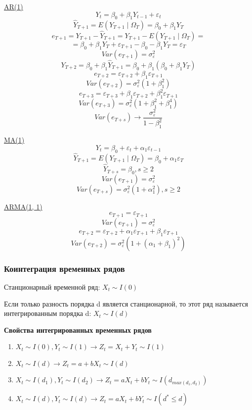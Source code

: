\documentclass[a4paper, 12pt]{article}
\begin{document}
\underline{AR(1)}
\[Y_t = \beta_0 + \beta_1 Y_{t - 1} + \varepsilon_t\]
\[\hat Y_{T + 1} = E(Y_{T+1} \mid \Omega_{T}) = \beta_0 + \beta_1 Y_T\]
\[e_{T + 1} = Y_{T+1} - \hat Y_{T + 1} = Y_{T + 1} - E(Y_{T+1} \mid \Omega_{T}) = \]
\[= \beta_0 + \beta_1 Y_T + \varepsilon_{T + 1} - \beta_0 - \beta_1 Y_T = \varepsilon_T\]
\[Var(e_{T + 1}) = \sigma_{\varepsilon}^{2}\]
\[Y_{T + 2} = \beta_0 + \beta_1 \hat Y_{T + 1} = \beta_0 + \beta_1(\beta_0 + \beta_1 Y_T)\]
\[e_{T+2} = \varepsilon_{T + 2} + \beta_1 \varepsilon_{T + 1}\]
\[Var(e_{T+2}) = \sigma_{\varepsilon}^{2}(1 + \beta_{1}^{2})\]
\[e_{T + 3} = \varepsilon_{T + 3} + \beta_1 \varepsilon_{T + 2} + \beta_{1}^{2} \varepsilon_{T + 1}\]
\[Var(e_{T + 3}) = \sigma_{\varepsilon}^{2}(1 + \beta_{1}^{2} + \beta_{1}^{4})\]
\[Var(e_{T +s}) \rightarrow \frac{\sigma_{\varepsilon}^{2}}{1 - \beta_{1}^{2}}\]

\underline{MA(1)}
\[Y_{t} = \beta_0 + \varepsilon_{t} + \alpha_{1}\varepsilon_{t-1}\]
\[\hat Y_{T + 1} = E(Y_{T + 1} \mid \Omega_{T}) = \beta_0 + \alpha_1 \varepsilon_T\]
\[\hat Y_{T + s} = \beta_0, s \geq 2\]
\[Var(e_{T + 1}) = \sigma_{\varepsilon}^{2}\]
\[Var(e_{T + s}) = \sigma_{\varepsilon}^{2}(1 + \alpha_{1}^{2}), s \geq 2\]

\underline{ARMA(1, 1)}
\[e_{T + 1} = \varepsilon_{T + 1}\]
\[Var(e_{T + 1}) = \sigma_{\varepsilon}^{2}\]
\[e_{T + 2} = \varepsilon_{T + 2} + \alpha_1 \varepsilon_{T + 1} + \beta_{1} \varepsilon_{T + 1}\]
\[Var(e_{T + 2}) = \sigma_{\varepsilon}^{2}(1 + (\alpha_{1} + \beta_{1})^{2})\]

\subsubsection{Коинтеграция временных рядов}

Станционарный временной ряд: $X_t \sim I(0)$

Если только разность порядка d является станционарной, то этот ряд называется интегрированным порядка d:
$X_t \sim I(d)$


\textbf{Свойства интегрированных временных рядов}

\begin{enumerate}
    \item $X_t \sim I(0), Y_t \sim I(1) \rightarrow Z_t = X_t + Y_t \sim I(1)$
    \item $X_t \sim I(d) \rightarrow Z_t = a + bX_t \sim I(d)$
    \item $X_t \sim I(d_1), Y_t \sim I(d_2) \rightarrow Z_t = aX_t + bY_t \sim I(d_{max(d_1, d_2)})$
    \item $X_t \sim I(d), Y_t \sim I(d) \rightarrow Z_t = aX_t + bY_t \sim I(d^{*} \leq d)$
\end{enumerate}
\end{document}
